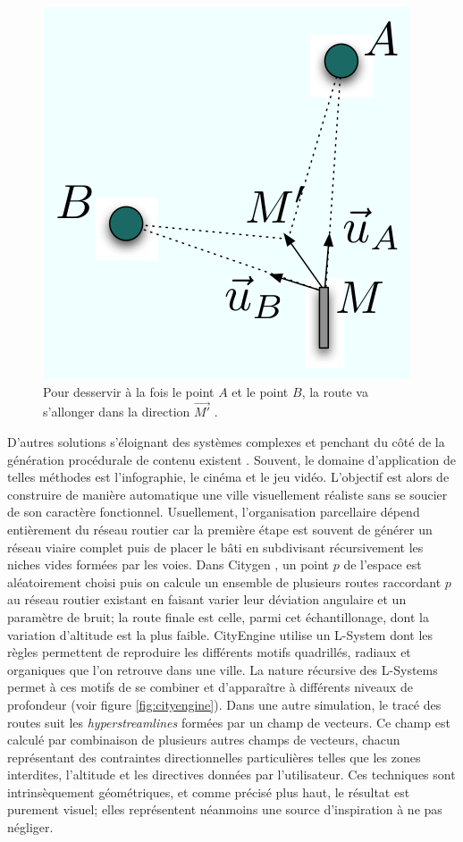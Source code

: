 \documentclass[10pt]{article}
\begin{document}
\begin{figure}[H]
  \centering
  \includegraphics[width=.5\linewidth]{images/barthelemy-road.png}
  \caption{Pour desservir à la fois le point $A$ et le point $B$, la
    route va s'allonger dans la direction $\vec{M'}$
    \cite{Barthelemy2008,Barthelemy2009}.}
  \label{fig:barthelemy}
\end{figure}

D'autres solutions s'éloignant des systèmes complexes et penchant du
côté de la génération procédurale de contenu existent
\cite{Kelly2006}. Souvent, le domaine d'application de telles méthodes
est l'infographie, le cinéma et le jeu vidéo. L'objectif est alors de
construire de manière automatique une ville visuellement réaliste sans
se soucier de son caractère fonctionnel. Usuellement, l'organisation
parcellaire dépend entièrement du réseau routier car la première étape
est souvent de générer un réseau viaire complet puis de placer le bâti
en subdivisant récursivement les niches vides formées par les
voies. Dans Citygen \cite{Kelly2006b}, un point $p$ de l'espace est
aléatoirement choisi puis on calcule un ensemble de plusieurs routes
raccordant $p$ au réseau routier existant en faisant varier leur
déviation angulaire et un paramètre de bruit; la route finale est
celle, parmi cet échantillonage, dont la variation d'altitude est la
plus faible. CityEngine \cite{Parish2001} utilise un L-System dont les
règles permettent de reproduire les différents motifs quadrillés,
radiaux et organiques que l'on retrouve dans une ville. La nature
récursive des L-Systems permet à ces motifs de se combiner et
d'apparaître à différents niveaux de profondeur (voir figure
\ref{fig:cityengine}). Dans une autre simulation, le tracé des routes
suit les \textit{hyperstreamlines} \cite{Chen2008} formées par un
champ de vecteurs. Ce champ est calculé par combinaison de plusieurs
autres champs de vecteurs, chacun représentant des contraintes
directionnelles particulières telles que les zones interdites,
l'altitude et les directives données par l'utilisateur. Ces techniques
sont intrinsèquement géométriques, et comme précisé plus haut, le
résultat est purement visuel; elles représentent néanmoins une source
d'inspiration à ne pas négliger.
\end{document}
